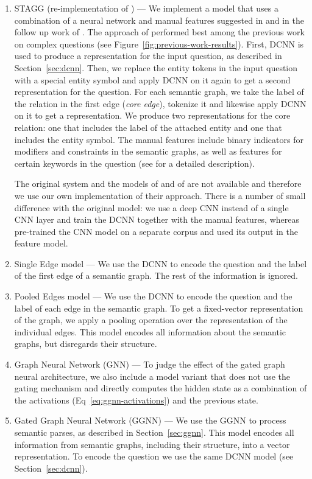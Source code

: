 \documentclass[11pt]{article}
\begin{document}
\begin{enumerate}
  \item STAGG (re-implementation of ) --- We implement a model that uses a combination of a neural network and manual features suggested in  and in the follow up work of . The approach of  performed best among the previous work on complex questions (see Figure~\ref{fig:previous-work-results}). First, DCNN is used to produce a representation for the input question, as described in Section~\ref{sec:dcnn}. Then, we replace the entity tokens in the input question with a special entity symbol   and apply DCNN on it again to get a second representation for the question. For each semantic graph, we take the label of the relation in the first edge (\textit{core edge}), tokenize it and likewise apply DCNN on it to get a representation. We produce two representations for the core relation: one that includes the label of the attached entity and one that includes the entity symbol. The manual features include binary indicators for modifiers and constraints in the semantic graphs, as well as features for certain keywords in the question (see  for a detailed description). 
  
The original system and the models of  and of  are not available and therefore we use our own implementation of their approach. There is a number of small difference with the original model: we use a deep CNN instead of a single CNN layer and train the DCNN together with the manual features, whereas  pre-trained the CNN model on a separate corpus and used its output in the feature model.

  \item Single Edge model --- We use the DCNN to encode the question and the label of the first edge of a semantic graph. The rest of the information is ignored.
  \item Pooled Edges model --- We use the DCNN to encode the question and the label of each edge in the semantic graph. To get a fixed-vector representation of the graph, we apply a pooling operation over the representation of the individual edges. This model encodes all information about the semantic graphs, but disregards their structure.
  \item Graph Neural Network (GNN) --- To judge the effect of the gated graph neural architecture, we also include a model variant that does not use the gating mechanism and directly computes the hidden state as a combination of the activations (Eq~\ref{eq:ggnn-activations}) and the previous state.
  \item Gated Graph Neural Network (GGNN) --- We use the GGNN to process semantic parses, as described in Section~\ref{sec:ggnn}. This model encodes all information from semantic graphs, including their structure, into a vector representation. To encode the question we use the same DCNN model (see Section~\ref{sec:dcnn}).
    
\end{enumerate}
\end{document}
